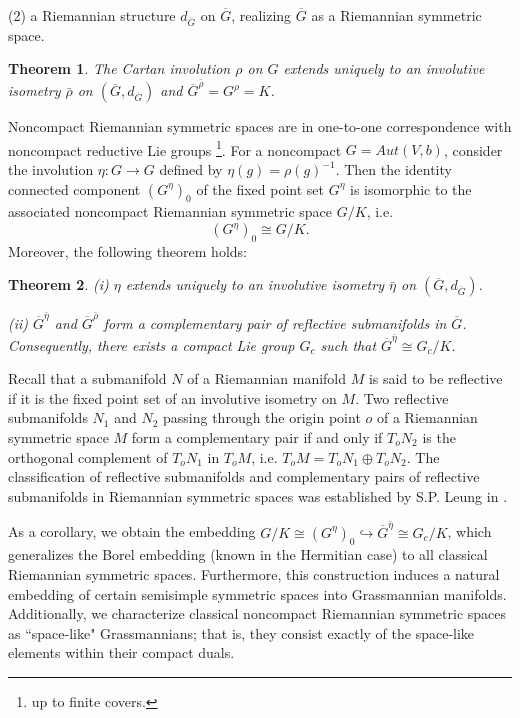 \documentclass{article}
\newtheorem{thm}{Theorem}[section]
\begin{document}
(2) a Riemannian structure $d_{\overline{G}}$ on $\overline{G}$, realizing $\overline{G}$ as a Riemannian symmetric space.
\begin{thm}
The Cartan involution $\rho$ on $G$ extends uniquely to an involutive isometry $\bar{\rho}$ on $(\overline{G}, d_{\overline{G}})$ and $\overline{G}^{\bar{\rho}}=G^{\rho}=K$.
\end{thm}
Noncompact Riemannian symmetric spaces are in one-to-one correspondence with  noncompact reductive Lie groups \footnote{up to  finite covers.}.
For a noncompact  $G=Aut(V,b)$,  consider the involution $\eta: G \rightarrow G$ defined by  $\eta(g)=\rho(g)^{-1}$.
Then the identity connected component $(G^{\eta})_0$ of the fixed point set $G^{\eta}$ is isomorphic to the associated noncompact Riemannian symmetric space
$G/K$, i.e.
 \[
 (G^{\eta})_0 \cong G/K.
 \]
 Moreover, the following theorem holds:
\begin{thm}
(i) $\eta$ extends uniquely to an involutive isometry $\bar{\eta}$ on $(\overline{G}, d_{\overline{G}})$.

(ii) $\overline{G}^{\bar{\eta}}$ and $\overline{G}^{\bar{\rho}}$ form a complementary  pair of reflective submanifolds in $\overline{G}$. Consequently, there exists a compact Lie group $G_c$ such that $\overline{G}^{\bar{\eta}} \cong G_c/K$.
\end{thm}
Recall that a submanifold $N$ of a Riemannian manifold $M$ is said to be reflective if it is the fixed point set
of an involutive isometry on $M$. Two reflective submanifolds $N_1$ and $N_2$ passing through the origin point $o$ of a Riemannian symmetric space $M$
form a complementary  pair if and only if $T_oN_2$ is the orthogonal complement of $T_oN_1$ in $T_oM$, i.e. $T_oM=T_oN_1\oplus T_oN_2$. The classification of reflective submanifolds
and complementary pairs of reflective submanifolds in Riemannian symmetric spaces was established by S.P. Leung in \cite{L2}.

As a corollary, we obtain the embedding $G/K \cong (G^{\eta})_0 \hookrightarrow \overline{G}^{\bar{\eta}} \cong G_c/K$, which generalizes the Borel embedding (known in the Hermitian case) to all classical Riemannian symmetric spaces. Furthermore, this construction induces a natural embedding of certain semisimple symmetric spaces into Grassmannian manifolds.
Additionally, we characterize classical noncompact Riemannian symmetric spaces as ``space-like" Grassmannians; that is, they consist exactly of the space-like elements within their compact duals.
\end{document}
